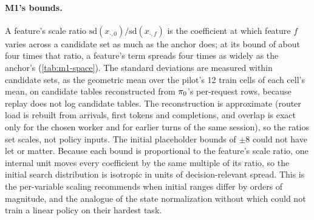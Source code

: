 \paragraph{M1's bounds.}
A feature's scale ratio $\mathrm{sd}(x_{\cdot,0}) / \mathrm{sd}(x_{\cdot,f})$ is the coefficient
at which feature $f$ varies across a candidate set as much as the anchor does; at its bound of
about four times that ratio, a feature's term spreads four times as widely as the anchor's
(\cref{tab:m1-space}). The standard deviations are measured within candidate sets, as the geometric
mean over the pilot's 12 train cells of each cell's mean, on candidate tables reconstructed from
$\pi_{0}$'s per-request rows, because replay does not log candidate tables. The reconstruction is
approximate (router load is rebuilt from arrivals, first tokens and completions, and overlap is
exact only for the chosen worker and for earlier turns of the same session), so the ratios set
scales, not policy inputs. The initial placeholder bounds of $\pm 8$ could not have let
 or  matter.
Because each bound is proportional to the feature's scale ratio, one internal unit moves every
coefficient by the same multiple of its ratio, so the initial search distribution is isotropic in
units of decision-relevant spread. This is the per-variable scaling \citet{hansen2016tutorial}
recommends when initial ranges differ by orders of magnitude, and the analogue of the state
normalization without which \citet{mania2018ars} could not train a linear policy on their
hardest task.


